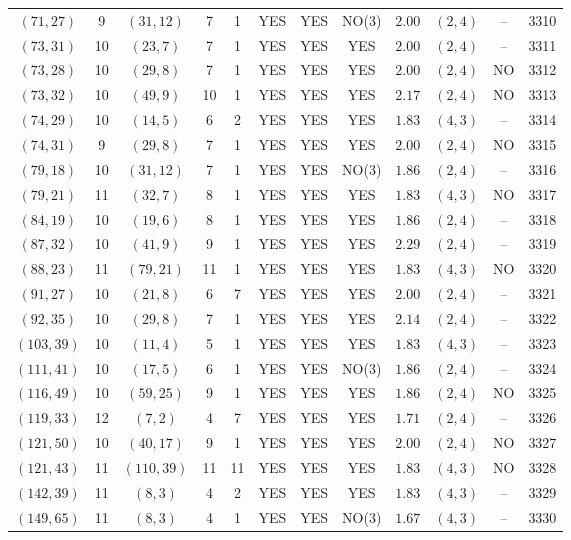 \begin{longtable}{|c|c|c|c|c|c|c|c|c|c|c|c|}
$(71,27)$ & 9 & $(31,12)$ & 7 & 1 & YES & YES & NO(3) & $2.00$ & $(2,4)$ & -- & 3310\\
$(73,31)$ & 10 & $(23,7)$ & 7 & 1 & YES & YES & YES & $2.00$ & $(2,4)$ & -- & 3311\\
$(73,28)$ & 10 & $(29,8)$ & 7 & 1 & YES & YES & YES & $2.00$ & $(2,4)$ & NO & 3312\\
$(73,32)$ & 10 & $(49,9)$ & 10 & 1 & YES & YES & YES & $2.17$ & $(2,4)$ & NO & 3313\\
$(74,29)$ & 10 & $(14,5)$ & 6 & 2 & YES & YES & YES & $1.83$ & $(4,3)$ & -- & 3314\\
$(74,31)$ & 9 & $(29,8)$ & 7 & 1 & YES & YES & YES & $2.00$ & $(2,4)$ & NO & 3315\\
$(79,18)$ & 10 & $(31,12)$ & 7 & 1 & YES & YES & NO(3) & $1.86$ & $(2,4)$ & -- & 3316\\
$(79,21)$ & 11 & $(32,7)$ & 8 & 1 & YES & YES & YES & $1.83$ & $(4,3)$ & NO & 3317\\
$(84,19)$ & 10 & $(19,6)$ & 8 & 1 & YES & YES & YES & $1.86$ & $(2,4)$ & -- & 3318\\
$(87,32)$ & 10 & $(41,9)$ & 9 & 1 & YES & YES & YES & $2.29$ & $(2,4)$ & -- & 3319\\
$(88,23)$ & 11 & $(79,21)$ & 11 & 1 & YES & YES & YES & $1.83$ & $(4,3)$ & NO & 3320\\
$(91,27)$ & 10 & $(21,8)$ & 6 & 7 & YES & YES & YES & $2.00$ & $(2,4)$ & -- & 3321\\
$(92,35)$ & 10 & $(29,8)$ & 7 & 1 & YES & YES & YES & $2.14$ & $(2,4)$ & -- & 3322\\
$(103,39)$ & 10 & $(11,4)$ & 5 & 1 & YES & YES & YES & $1.83$ & $(4,3)$ & -- & 3323\\
$(111,41)$ & 10 & $(17,5)$ & 6 & 1 & YES & YES & NO(3) & $1.86$ & $(2,4)$ & -- & 3324\\
$(116,49)$ & 10 & $(59,25)$ & 9 & 1 & YES & YES & YES & $1.86$ & $(2,4)$ & NO & 3325\\
$(119,33)$ & 12 & $(7,2)$ & 4 & 7 & YES & YES & YES & $1.71$ & $(2,4)$ & -- & 3326\\
$(121,50)$ & 10 & $(40,17)$ & 9 & 1 & YES & YES & YES & $2.00$ & $(2,4)$ & NO & 3327\\
$(121,43)$ & 11 & $(110,39)$ & 11 & 11 & YES & YES & YES & $1.83$ & $(4,3)$ & NO & 3328\\
$(142,39)$ & 11 & $(8,3)$ & 4 & 2 & YES & YES & YES & $1.83$ & $(4,3)$ & -- & 3329\\
$(149,65)$ & 11 & $(8,3)$ & 4 & 1 & YES & YES & NO(3) & $1.67$ & $(4,3)$ & -- & 3330\\

\end{longtable}
